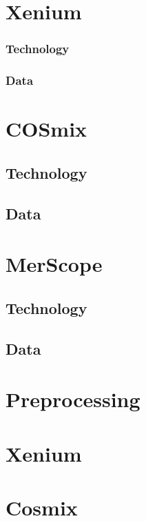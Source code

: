 \documentclass[
]{book}
\begin{document}
\chapter{Xenium}\label{xenium}

\subsection{Technology}\label{technology}

\subsection{Data}\label{data}

\chapter{COSmix}\label{cosmix}

\section{Technology}\label{technology-1}

\section{Data}\label{data-1}

\chapter{MerScope}\label{merscope}

\section{Technology}\label{technology-2}

\section{Data}\label{data-2}

\chapter{Preprocessing}\label{preprocessing}

\chapter{Xenium}\label{xenium-1}

\chapter{Cosmix}\label{cosmix-1}
\end{document}
